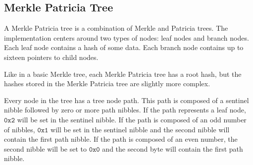 \begin{figure}[H]
\end{figure}

\subsection{Merkle Patricia Tree}

A Merkle Patricia tree is a combination of Merkle and Patricia trees.
The \codenamespace implementation centers around two types of nodes: leaf nodes and branch nodes.
Each leaf node contains a hash of some data.
Each branch node contains up to sixteen pointers to child nodes.

Like in a basic Merkle tree, each Merkle Patricia tree has a root hash, but the hashes stored in the Merkle Patricia tree are slightly more complex.

Every node in the tree has a tree node path.
This path is composed of a sentinel nibble followed by zero or more path nibbles.
If the path represents a leaf node, $\texttt{0x2}$ will be set in the sentinel nibble.
If the path is composed of an odd number of nibbles, $\texttt{0x1}$ will be set in the sentinel nibble and the second nibble will contain the first path nibble.
If the path is composed of an even number, the second nibble will be set to $\texttt{0x0}$ and the second byte will contain the first path nibble.

